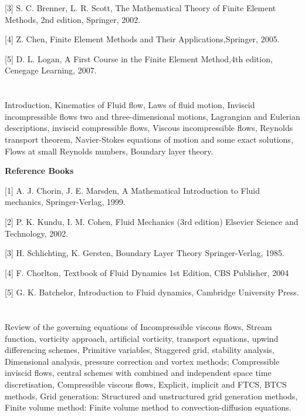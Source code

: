 [3] S. C. Brenner, L. R. Scott, The Mathematical Theory of Finite Element Methods, 2nd edition, Springer, 2002. 

[4] Z. Chen, Finite Element Methods and Their Applications,Springer, 2005. 

[5] D. L. Logan, A First Course in the Finite Element Method,4th edition, Cenegage Learning, 2007. 

 
\section{\dsccourseinfo} 

 

Introduction, Kinematics of Fluid flow, Laws of fluid motion, Inviscid incompressible flows two and three-dimensional motions, Lagrangian and Eulerian descriptions, inviscid compressible flows, Viscous incompressible flows, Reynolds transport theorem, Navier-Stokes equations of motion and some exact solutions, Flows at small Reynolds numbers, Boundary layer theory. 

\textbf{Reference Books} 

[1] A. J. Chorin, J. E. Marsden, A Mathematical Introduction to Fluid mechanics, Springer-Verlag, 1999. 

[2] P. K. Kundu, I. M. Cohen, Fluid Mechanics (3rd edition) Elsevier Science and Technology, 2002. 

[3] H. Schlichting, K. Gersten, Boundary Layer Theory Springer-Verlag, 1985. 

[4] F. Chorlton, Textbook of Fluid Dynamics 1st Edition, CBS Publisher, 2004 

[5] G. K. Batchelor, Introduction to Fluid dynamics, Cambridge University Press. 

 
\section{\dsccourseinfo} 

Review of the governing equations of Incompressible viscous flows, Stream function, vorticity approach, artificial vorticity, transport equations, upwind differencing schemes, Primitive variables, Staggered grid, stability analysis, Dimensional analysis, pressure correction and vortex methods; Compressible inviscid flows, central schemes with combined and independent space time discretisation, Compressible viscous flows, Explicit, implicit and FTCS, BTCS methods, Grid generation: Structured and unstructured grid generation methods, Finite volume method: Finite volume method to convection-diffusion equations. 

